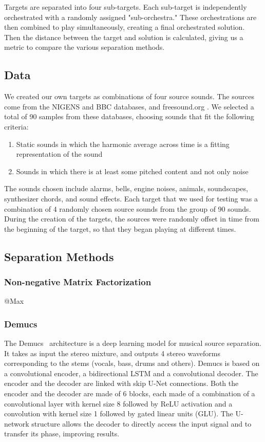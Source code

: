 \documentclass{article}
\begin{document}
	Targets are separated into four sub-targets. Each sub-target is independently orchestrated with a randomly assigned "sub-orchestra." These orchestrations are then combined to play simultaneously, creating a final orchestrated solution. Then the distance between the target and solution is calculated, giving us a metric to compare the various separation methods.
	
		\subsection{Data}
		We created our own targets as combinations of four source sounds. The sources come from the NIGENS \cite{NIGENS} and BBC \cite{BBC} databases, and freesound.org \cite{freesound}. We selected a total of 90 samples from these databases, choosing sounds that fit the following criteria: 
		
		\begin{enumerate}
			\item Static sounds in which the harmonic average across time is a fitting representation of the sound
			\item Sounds in which there is at least some pitched content and not only noise
		\end{enumerate}			
		The sounds chosen include alarms, bells, engine noises, animals, soundscapes, synthesizer chords, and sound effects. Each target that we used for testing was a combination of 4 randomly chosen source sounds from the group of 90 sounds. During the creation of the targets, the sources were randomly offset in time from the beginning of the target, so that they began playing at different times.
		
		\subsection{Separation Methods}
	
			\subsubsection{Non-negative Matrix Factorization}
			@Max 
			
			\subsubsection{Demucs}
			The Demucs~\cite{demucs} architecture is a deep learning model for musical source separation. It takes as input the stereo mixture, and outputs 4 stereo waveforms corresponding to the stems (vocals, bass, drums and others). Demucs is based on a convolutional encoder, a bidirectional LSTM and a convolutional decoder. The encoder and the decoder are linked with skip U-Net connections. Both the encoder and the decoder are made of 6  blocks, each made of a combination of a convolutional layer with kernel size 8 followed by ReLU activation and a convolution with kernel size 1 followed by gated linear units (GLU). The U-network structure allows the decoder to directly access the input signal and to transfer its phase, improving results.	
			
\end{document}
